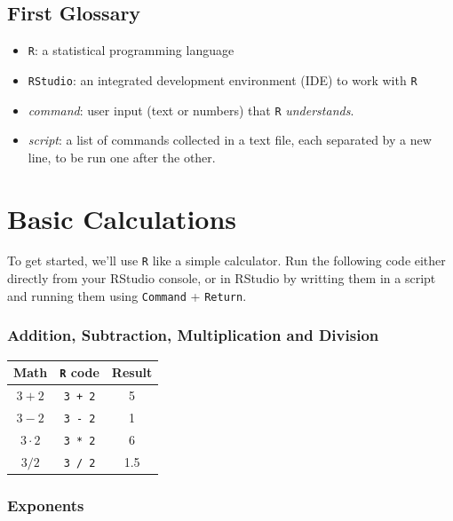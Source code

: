 \documentclass[]{book}
\providecommand{\tightlist}{%
  \setlength{\itemsep}{0pt}\setlength{\parskip}{0pt}}
\begin{document}
\subsection{First Glossary}\label{first-glossary}

\begin{itemize}
\tightlist
\item
  \texttt{R}: a statistical programming language
\item
  \texttt{RStudio}: an integrated development environment (IDE) to work
  with \texttt{R}
\item
  \emph{command}: user input (text or numbers) that \texttt{R}
  \emph{understands}.
\item
  \emph{script}: a list of commands collected in a text file, each
  separated by a new line, to be run one after the other.
\end{itemize}

\section{Basic Calculations}\label{basic-calculations}

To get started, we'll use \texttt{R} like a simple calculator. Run the
following code either directly from your RStudio console, or in RStudio
by writting them in a script and running them using \texttt{Command} +
\texttt{Return}.

\subsubsection*{Addition, Subtraction, Multiplication and
Division}\label{addition-subtraction-multiplication-and-division}

\begin{longtable}[]{@{}ccc@{}}
\toprule
Math & \texttt{R} code & Result\tabularnewline
\midrule
\endhead
\(3 + 2\) & \texttt{3\ +\ 2} & 5\tabularnewline
\(3 - 2\) & \texttt{3\ -\ 2} & 1\tabularnewline
\(3 \cdot2\) & \texttt{3\ *\ 2} & 6\tabularnewline
\(3 / 2\) & \texttt{3\ /\ 2} & 1.5\tabularnewline
\bottomrule
\end{longtable}

\subsubsection*{Exponents}\label{exponents}
\end{document}
